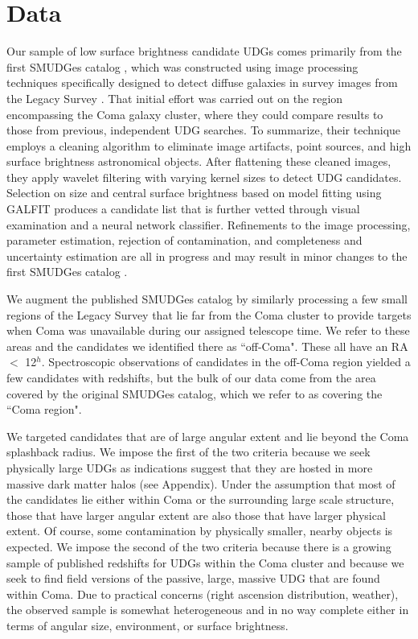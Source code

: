 \documentclass[twocolumn,tighten]{aastex63}
\begin{document}

\section{Data}
\label{sec:data}

Our sample of low surface brightness candidate UDGs comes primarily from the first SMUDGes catalog \citep{Zaritsky19}, which was constructed using image processing techniques specifically designed to detect diffuse galaxies in survey images from the Legacy Survey \citep{dey}. That initial effort was carried out on the region encompassing the Coma galaxy cluster, where they could compare results to those from previous, independent UDG searches. To summarize, their technique employs a cleaning algorithm to eliminate image artifacts, point sources, and high surface brightness astronomical objects. After flattening these cleaned images, they apply wavelet filtering with varying kernel sizes to detect UDG candidates.  Selection on size and central surface brightness based on model fitting using GALFIT \citep{galfit1, galfit2} produces a candidate list that is further vetted through visual examination and a neural network classifier. Refinements to the image processing, parameter estimation, rejection of contamination, and completeness and uncertainty estimation are all in progress and may result in minor changes to the first SMUDGes catalog \citep{smudges2}. 

We augment the published SMUDGes catalog by similarly processing a few small regions of the Legacy Survey that lie far from the Coma cluster to provide targets when Coma was unavailable during our assigned telescope time. We refer to these areas and the candidates we identified there as ``off-Coma". These all have an RA $<$ 12$^h$. Spectroscopic observations of candidates in the off-Coma region yielded a few candidates with redshifts, but the bulk of our data come from the area covered by the original SMUDGes catalog, which we refer to as covering the ``Coma region".

We targeted candidates that are of large angular extent and lie beyond the Coma splashback radius. We impose the first of the two criteria because we seek physically large UDGs as indications suggest that they are hosted in more massive dark matter halos (see Appendix). Under the assumption that most of the candidates lie either within Coma or the surrounding large scale structure, those that have larger angular extent are also those that have larger physical extent. Of course, some contamination by physically smaller, nearby objects is expected. We impose the second of the two criteria because there is a growing sample of published redshifts for UDGs within the Coma cluster and because we seek to find field versions of the passive, large, massive UDG that are found within Coma. Due to practical concerns (right ascension distribution, weather), the observed sample is somewhat heterogeneous and in no way complete either in terms of angular size, environment, or surface brightness. 
\end{document}
